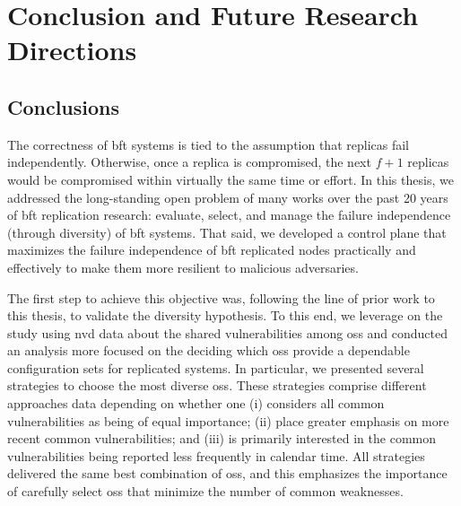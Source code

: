 \chapter{Conclusion and Future Research Directions}
\label{chap:conclusion}

\section{Conclusions}
The correctness of \gls{bft} systems is tied to the assumption that replicas fail independently. 
Otherwise, once a replica is compromised, the next $f+1$ replicas would be compromised within virtually the same time or effort.
In this thesis, we addressed the long-standing open problem of many works over the past 20 years of \gls{bft} replication research: evaluate, select, and manage the failure independence (through diversity) of \gls{bft} systems.
That said, we developed a control plane that maximizes the failure independence of \gls{bft} replicated nodes practically and effectively to make them more resilient to malicious adversaries.


The first step to achieve this objective was, following the line of prior work to this thesis, to validate the diversity hypothesis.  
To this end, we leverage on the study using \gls{nvd} data about the shared vulnerabilities among \glspl{os} and conducted an analysis more focused on the deciding which \glspl{os} provide a dependable configuration sets for replicated systems.
In particular, we presented several strategies to choose the most diverse \glspl{os}.
These strategies comprise different approaches data depending on whether one (i) considers all common vulnerabilities as being of equal importance; (ii) place greater emphasis on more recent common vulnerabilities; and (iii) is primarily interested in the common vulnerabilities being reported less frequently in calendar time.
All strategies delivered the same best combination of \glspl{os}, and this emphasizes the importance of carefully select \glspl{os} that minimize the number of common weaknesses.


